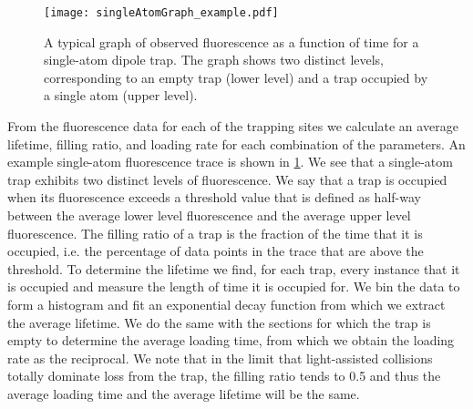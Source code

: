 \documentclass[../Thesis-IJspeert.tex]{subfiles}
\begin{document}

\iffalse
\begin{figure}[tb]
	\centering
	\texttt{[image: singleAtomGraph\_example.pdf]}
	\caption{A typical graph of observed fluorescence as a function of time for a single-atom dipole trap. The graph shows two distinct levels, corresponding to an empty trap (lower level) and a trap occupied by a single atom (upper level).}
	\label{fig:singleAtomGraph}
\end{figure}



From the fluorescence data for each of the trapping sites we calculate an average lifetime, filling ratio, and loading rate for each combination of the parameters. An example single-atom fluorescence trace is shown in \cref{fig:singleAtomGraph}. We see that a single-atom trap exhibits two distinct levels of fluorescence. We say that a trap is occupied when its fluorescence exceeds a threshold value that is defined as half-way between the average lower level fluorescence and the average upper level fluorescence. The filling ratio of a trap is the fraction of the time that it is occupied, i.e. the percentage of data points in the trace that are above the threshold. To determine the lifetime we find, for each trap, every instance that it is occupied and measure the length of time it is occupied for. We bin the data to form a histogram and fit an exponential decay function from which we extract the average lifetime. We do the same with the sections for which the trap is empty to determine the average loading time, from which we obtain the loading rate as the reciprocal. We note that in the limit that light-assisted collisions totally dominate loss from the trap, the filling ratio tends to \num{0.5} and thus the average loading time and the average lifetime will be the same. 
\end{document}
